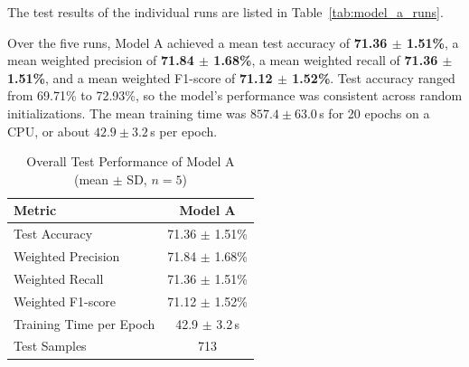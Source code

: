 \documentclass[12pt,a4paper]{article}
\begin{document}
The test results of the individual runs are listed in
Table~\ref{tab:model_a_runs}.

\begin{table}[H]
\centering
\caption{Test performance of Model A over five independent runs}
\label{tab:model_a_runs}
\end{table}

Over the five runs, Model A achieved a mean test accuracy of
\textbf{71.36 $\pm$ 1.51\%}, a mean weighted precision of
\textbf{71.84 $\pm$ 1.68\%}, a mean weighted recall of
\textbf{71.36 $\pm$ 1.51\%}, and a mean weighted F1-score of
\textbf{71.12 $\pm$ 1.52\%}. Test accuracy ranged from 69.71\% to
72.93\%, so the model's performance was consistent across random
initializations. The mean training time was $857.4\pm63.0$\,s for 20
epochs on a CPU, or about $42.9\pm3.2$\,s per epoch.

\begin{table}[H]
\centering
\caption{Overall Test Performance of Model A (mean $\pm$ SD, $n=5$)}
\label{tab:model_a_overall}
\begin{tabular}{lc}
\hline
\textbf{Metric} & \textbf{Model A} \\
\hline
Test Accuracy & 71.36 $\pm$ 1.51\% \\
Weighted Precision & 71.84 $\pm$ 1.68\% \\
Weighted Recall & 71.36 $\pm$ 1.51\% \\
Weighted F1-score & 71.12 $\pm$ 1.52\% \\
Training Time per Epoch & 42.9 $\pm$ 3.2\,s \\
Test Samples & 713 \\
\hline
\end{tabular}
\end{table}
\end{document}
